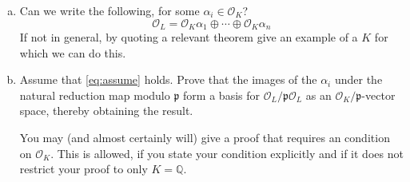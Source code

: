 \documentclass[12pt]{amsart}
\newcommand{\calO}{\mathcal{O}}
\newcommand{\p}{\mathfrak{p}}
\begin{document}
\begin{enumerate}[1.]
\begin{enumerate}[(a)]
\item
Can we write the following, for some $\alpha_i \in \calO_K$?
\begin{equation}\label{eq:assume}
\calO_L = \calO_K \alpha_1 \oplus \cdots \oplus \calO_K \alpha_n
\end{equation}
If not in general, by quoting a relevant theorem 
give an example of a $K$ for which we can do this. 
\item
Assume that \eqref{eq:assume} holds. Prove that the images of the
$\alpha_i$ under the natural reduction map modulo $\p$ form a basis
for $\calO_L / \p \calO_L$ as an $\calO_K/\p$-vector space, thereby
obtaining the result.

You may (and almost certainly will) give a proof that requires an
condition on $\calO_K$. This is allowed, if you state your condition
explicitly and if it does not restrict your proof to only $K = \mathbb{Q}$.
\end{enumerate}

\end{enumerate}
\end{document}
